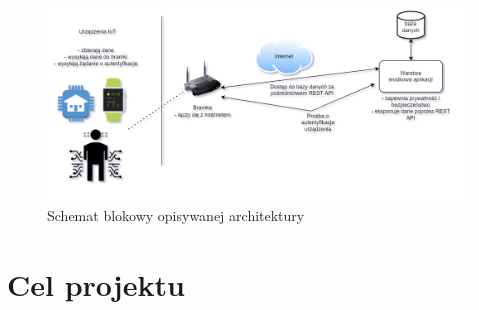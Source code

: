 \documentclass[12pt, twoside, openany]{mwrep}
\begin{document}
\begin{figure}[H]
\centering
\includegraphics[width=\textwidth]{bezpieczenstwo}
\caption{Schemat blokowy opisywanej architektury}
\end{figure}

\chapter{Cel projektu}
\end{document}
